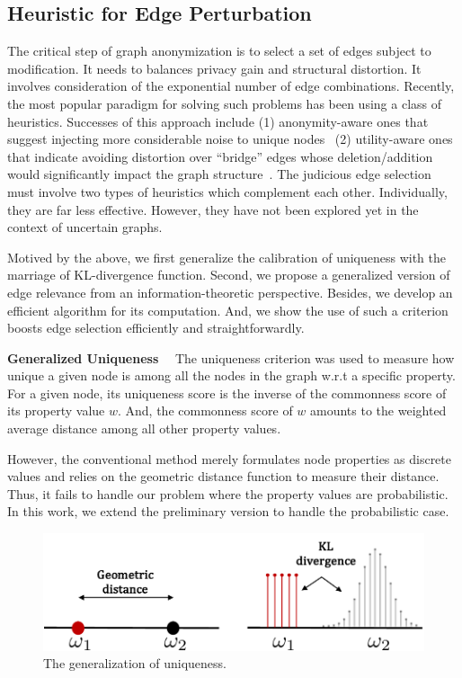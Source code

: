 \subsection{Heuristic for Edge Perturbation}

The critical step of graph anonymization is to select a set of edges subject to modification. 
It needs to balances privacy gain and structural distortion. 
It involves consideration of the exponential number of edge combinations. 
Recently, the most popular paradigm for solving such problems has been using a class of heuristics. 
Successes of this approach include
(1) anonymity-aware ones that suggest injecting more considerable noise to unique nodes~\cite{Ying2009,Boldi_Injecting_2012,Hay_Anonymizing_2007} 
(2) utility-aware ones that indicate avoiding distortion over “bridge” edges whose deletion/addition would significantly impact the graph structure~\cite{Wang2011,Ninggal_Utility_2015}. 
The judicious edge selection must involve two types of heuristics which complement each other. 
Individually, they are far less effective. 
However, they have not been explored yet in the context of uncertain graphs.

Motived by the above, we first generalize the calibration of uniqueness with the marriage of KL-divergence function. 
Second, we propose a generalized version of edge relevance from an information-theoretic perspective.
Besides, we develop an efficient algorithm for its computation.
And, we show the use of such a criterion boosts edge selection efficiently and straightforwardly.

\textbf{Generalized Uniqueness}~~
The uniqueness criterion was used to measure how unique a given node is among all the nodes in the graph w.r.t a specific property. 
For a given node, its uniqueness score is the inverse of the commonness score of its property value $w$.
And, the commonness score of $w$ amounts to the weighted average distance among all other property values.

However, the conventional method merely formulates node properties as discrete values and relies on the geometric distance function to measure their distance.  
Thus, it fails to handle our problem where the property values are probabilistic.
In this work, we extend the preliminary version to handle the probabilistic case. 

\begin{figure}[!htb]
  \vspace{-2pt}
  \centering
        \includegraphics[width=\linewidth]{ill/shift_distance.pdf}
    \caption{The generalization of uniqueness.}
    \vspace{-10pt}
\end{figure}

